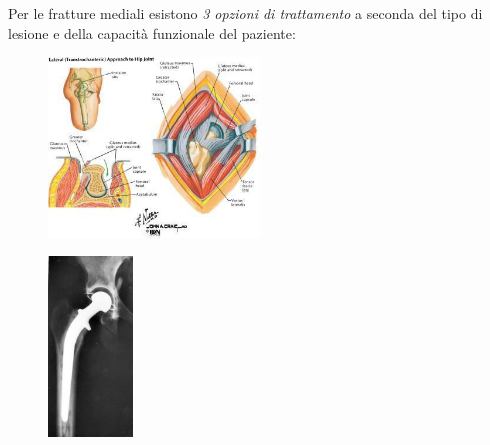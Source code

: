Per le fratture mediali esistono \emph{3 opzioni di trattamento} a
seconda del tipo di lesione e della capacità funzionale del paziente:
\begin{figure}[!ht]
\centering
	\includegraphics[width=0.5\textwidth]{007/image13.jpeg}
\end{figure}
\begin{figure}[!ht]
\centering
	\includegraphics[width=0.2\textwidth]{007/image15.jpeg}
\end{figure}
